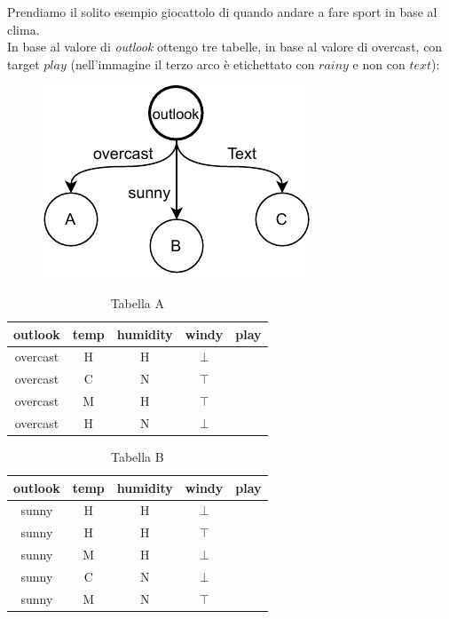 \documentclass[a4paper,12pt, oneside]{book}
\begin{document}
\begin{esempio}
  Prendiamo il solito esempio giocattolo di quando andare a fare sport in base
  al clima.\\
  In base al valore di \textit{outlook} ottengo tre tabelle, in base al valore
  di overcast, con target $play$ (nell'immagine il terzo arco è etichettato con
  $rainy$ e non con $text$):
  \begin{figure}[H]
    \centering
    \includegraphics[scale = 0.9]{img/dt2.pdf}
  \end{figure}
  \begin{table}[H]
    \centering
    \begin{tabular}{c|c|c|c|c}
      outlook & temp & humidity & windy & play\\
      \hline
      overcast & H & H & $\bot$ & \color{darkgreen}{yes}\\
      overcast & C & N & $\top$ & \color{darkgreen}{yes}\\
      overcast & M & H & $\top$ & \color{darkgreen}{yes}\\
      overcast & H & N & $\bot$ & \color{darkgreen}{yes}
    \end{tabular}
    \caption{Tabella A}
  \end{table}
  \begin{table}[H]
    \centering
    \begin{tabular}{c|c|c|c|c}
      outlook & temp & humidity & windy & play\\
      \hline
      sunny & H & H & $\bot$ & \color{red}{no}\\
      sunny & H & H & $\top$ & \color{red}{no}\\
      sunny & M & H & $\bot$ & \color{red}{no}\\
      sunny & C & N & $\bot$ & \color{darkgreen}{yes}\\
      sunny & M & N & $\top$ & \color{darkgreen}{yes}
    \end{tabular}
    \caption{Tabella B}

\end{table}
\end{esempio}
\end{document}
